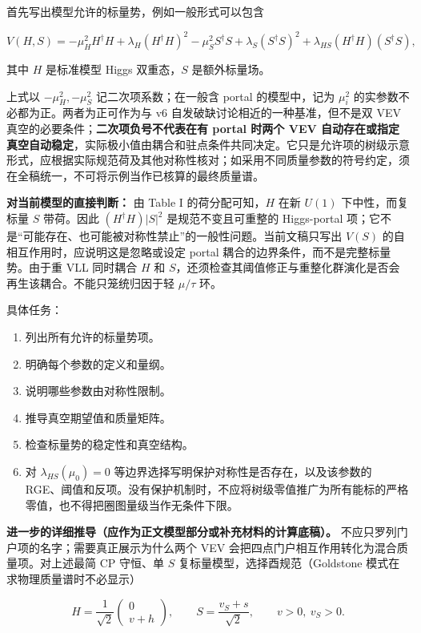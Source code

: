 \documentclass[
  chinese,
  UTF8]{ctexart}
\begin{document}
首先写出模型允许的标量势，例如一般形式可以包含

\[
V(H,S)=
-\mu_H^2 H^\dagger H
+\lambda_H(H^\dagger H)^2
-\mu_S^2 S^\dagger S
+\lambda_S(S^\dagger S)^2
+\lambda_{HS}(H^\dagger H)(S^\dagger S),
\]

其中 \(H\) 是标准模型 Higgs 双重态，\(S\) 是额外标量场。

上式以 \(-\mu_H^2,-\mu_S^2\) 记二次项系数；在一般含 portal
的模型中，记为 \(\mu_i^2\) 的实参数不必都为正。两者为正可作为与 v6
自发破缺讨论相近的一种基准，但不是双 VEV
真空的必要条件；\textbf{二次项负号不代表在有 portal 时两个 VEV
自动存在或指定真空自动稳定}，实际极小值由耦合和驻点条件共同决定。它只是允许项的树级示意形式，应根据实际规范荷及其他对称性核对；如采用不同质量参数的符号约定，须在全稿统一，不可将示例当作已核算的最终质量谱。

\textbf{对当前模型的直接判断：} 由 Table I 的荷分配可知，\(H\) 在新
\(U(1)\) 下中性，而复标量 \(S\) 带荷。因此 \((H^\dagger H)|S|^2\)
是规范不变且可重整的 Higgs-portal
项；它不是``可能存在、也可能被对称性禁止''的一般性问题。当前文稿只写出
\(V(S)\) 的自相互作用时，应说明这是忽略或设定 portal
耦合的边界条件，而不是完整标量势。由于重 VLL 同时耦合 \(H\) 和
\(S\)，还须检查其阈值修正与重整化群演化是否会再生该耦合。不能只笼统归因于轻
\(\mu/\tau\) 环。

具体任务：

\begin{enumerate}
\def\labelenumi{\arabic{enumi}.}
\item
  列出所有允许的标量势项。
\item
  明确每个参数的定义和量纲。
\item
  说明哪些参数由对称性限制。
\item
  推导真空期望值和质量矩阵。
\item
  检查标量势的稳定性和真空结构。
\item
  对 \(\lambda_{HS}(\mu_0)=0\)
  等边界选择写明保护对称性是否存在，以及该参数的
  RGE、阈值和反项。没有保护机制时，不应将树级零值推广为所有能标的严格零值，也不得把圈图量级当作无条件下限。
\end{enumerate}

\textbf{进一步的详细推导（应作为正文模型部分或补充材料的计算底稿）。}
不应只罗列门户项的名字；需要真正展示为什么两个 VEV
会把四点门户相互作用转化为混合质量项。对上述最简 CP 守恒、单 \(S\)
复标量模型，选择酉规范（Goldstone 模式在求物理质量谱时不必显示）

\[
H=\frac{1}{\sqrt2}\begin{pmatrix}0\\v+h\end{pmatrix},\qquad
S=\frac{v_S+s}{\sqrt2},\qquad v>0,\ v_S>0.
\]
\end{document}
